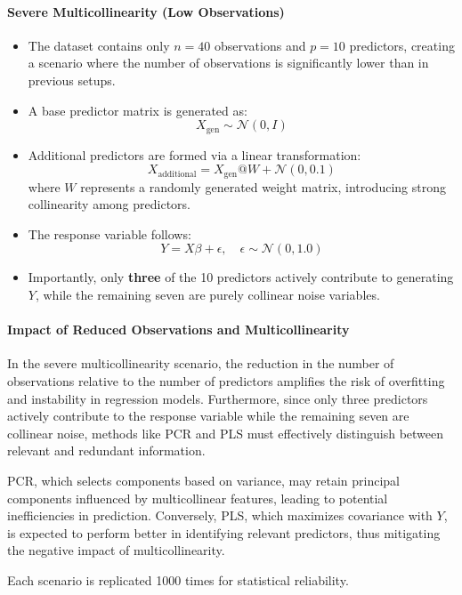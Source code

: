 \documentclass[11pt,twoside,a4paper]{article}
\begin{document}
\paragraph{Severe Multicollinearity (Low Observations)}
\begin{itemize}
    \item The dataset contains only \( n = 40 \) observations and \( p = 10 \) predictors, creating a scenario where the number of observations is significantly lower than in previous setups.
    \item A base predictor matrix is generated as:
    \[ X_{\text{gen}} \sim \mathcal{N}(0, I) \]
    \item Additional predictors are formed via a linear transformation:
    \[ X_{\text{additional}} = X_{\text{gen}} @ W + \mathcal{N}(0, 0.1) \]
    where \( W \) represents a randomly generated weight matrix, introducing strong collinearity among predictors.
    \item The response variable follows:
    \[ Y = X \beta + \epsilon, \quad \epsilon \sim \mathcal{N}(0, 1.0) \]
    \item Importantly, only \textbf{three} of the 10 predictors actively contribute to generating \( Y \), while the remaining seven are purely collinear noise variables.
\end{itemize}

\paragraph{Impact of Reduced Observations and Multicollinearity}
In the severe multicollinearity scenario, the reduction in the number of observations relative to the number of predictors amplifies the risk of overfitting and instability in regression models. Furthermore, since only three predictors actively contribute to the response variable while the remaining seven are collinear noise, methods like PCR and PLS must effectively distinguish between relevant and redundant information. 

PCR, which selects components based on variance, may retain principal components influenced by multicollinear features, leading to potential inefficiencies in prediction. Conversely, PLS, which maximizes covariance with \( Y \), is expected to perform better in identifying relevant predictors, thus mitigating the negative impact of multicollinearity.

Each scenario is replicated 1000 times for statistical reliability.
\end{document}
